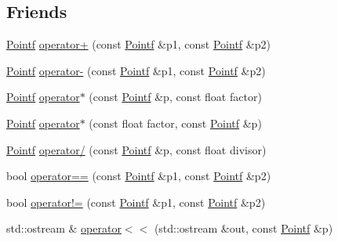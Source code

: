 \subsection*{Friends}
\begin{DoxyCompactItemize}
\item 
\hyperlink{classprism_1_1geometry_1_1_pointf}{Pointf} \hyperlink{classprism_1_1geometry_1_1_pointf_a32b96cc3995453a257c95f1a5048feec}{operator+} (const \hyperlink{classprism_1_1geometry_1_1_pointf}{Pointf} \&p1, const \hyperlink{classprism_1_1geometry_1_1_pointf}{Pointf} \&p2)
\item 
\hyperlink{classprism_1_1geometry_1_1_pointf}{Pointf} \hyperlink{classprism_1_1geometry_1_1_pointf_aa38ec65c1fe1ea8738ea87d584ce041b}{operator-\/} (const \hyperlink{classprism_1_1geometry_1_1_pointf}{Pointf} \&p1, const \hyperlink{classprism_1_1geometry_1_1_pointf}{Pointf} \&p2)
\item 
\hyperlink{classprism_1_1geometry_1_1_pointf}{Pointf} \hyperlink{classprism_1_1geometry_1_1_pointf_a3c30f12145ef35292b4bda98ffae5ed8}{operator$\ast$} (const \hyperlink{classprism_1_1geometry_1_1_pointf}{Pointf} \&p, const float factor)
\item 
\hyperlink{classprism_1_1geometry_1_1_pointf}{Pointf} \hyperlink{classprism_1_1geometry_1_1_pointf_af430cf92a6674e13f1b99a97f38c400a}{operator$\ast$} (const float factor, const \hyperlink{classprism_1_1geometry_1_1_pointf}{Pointf} \&p)
\item 
\hyperlink{classprism_1_1geometry_1_1_pointf}{Pointf} \hyperlink{classprism_1_1geometry_1_1_pointf_a574af11f980c5b1cfdbfe0c653f53bf2}{operator/} (const \hyperlink{classprism_1_1geometry_1_1_pointf}{Pointf} \&p, const float divisor)
\item 
bool \hyperlink{classprism_1_1geometry_1_1_pointf_a1459678221b6e093b6e5eedc4f6f52a0}{operator==} (const \hyperlink{classprism_1_1geometry_1_1_pointf}{Pointf} \&p1, const \hyperlink{classprism_1_1geometry_1_1_pointf}{Pointf} \&p2)
\item 
bool \hyperlink{classprism_1_1geometry_1_1_pointf_a15d703b43330fcb10ae27ce17ad1b96d}{operator!=} (const \hyperlink{classprism_1_1geometry_1_1_pointf}{Pointf} \&p1, const \hyperlink{classprism_1_1geometry_1_1_pointf}{Pointf} \&p2)
\item 
std\+::ostream \& \hyperlink{classprism_1_1geometry_1_1_pointf_a2e9f3497d53913f99ea6a76c400f0b58}{operator$<$$<$} (std\+::ostream \&out, const \hyperlink{classprism_1_1geometry_1_1_pointf}{Pointf} \&p)
\end{DoxyCompactItemize}



